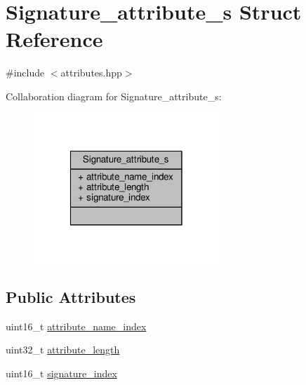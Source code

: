 \hypertarget{structSignature__attribute__s}{\section{Signature\+\_\+attribute\+\_\+s Struct Reference}
\label{structSignature__attribute__s}
}


{\ttfamily \#include $<$attributes.\+hpp$>$}



Collaboration diagram for Signature\+\_\+attribute\+\_\+s\+:\nopagebreak
\begin{figure}[H]
\begin{center}
\leavevmode
\includegraphics[width=198pt]{structSignature__attribute__s__coll__graph}
\end{center}
\end{figure}
\subsection*{Public Attributes}
\begin{DoxyCompactItemize}
\item 
uint16\+\_\+t \hyperlink{structSignature__attribute__s_a6c63cbbb5e2570691c9ae328440ae58f}{attribute\+\_\+name\+\_\+index}
\item 
uint32\+\_\+t \hyperlink{structSignature__attribute__s_a4a57dffe751f28ffe046dfdefe4a46fd}{attribute\+\_\+length}
\item 
uint16\+\_\+t \hyperlink{structSignature__attribute__s_a8c7f7f5f3002f25e5bfa1b637000433d}{signature\+\_\+index}
\end{DoxyCompactItemize}


